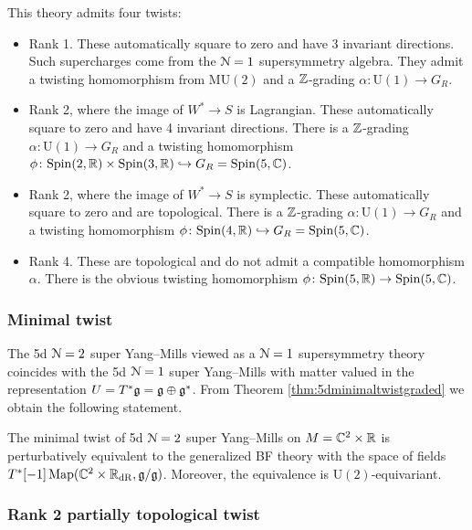 \documentclass[10pt, oneside]{article}
\newcommand{\MU}{\mathrm{MU}}
\renewcommand{\U}{\mathrm{U}}
\begin{document}
This theory admits four twists:
\begin{itemize}
\item Rank 1. These automatically square to zero and have 3 invariant directions. Such supercharges come from the $\mathcal N=1$ supersymmetry algebra. They admit a twisting homomorphism from $\MU(2)$ and a $\mathbb Z$-grading $\alpha\colon \U(1)\rightarrow G_R$.

\item Rank 2, where the image of $W^*\rightarrow S$ is Lagrangian. These automatically square to zero and have 4 invariant directions. There is a $\mathbb Z$-grading $\alpha\colon \U(1)\rightarrow G_R$ and a twisting homomorphism $\phi\colon \mathrm{Spin}(2, \mathbb R)\times \mathrm{Spin}(3, \mathbb R)\hookrightarrow G_R=\mathrm{Spin}(5, \mathbb C)$.

\item Rank 2, where the image of $W^*\rightarrow S$ is symplectic. These automatically square to zero and are topological. There is a $\mathbb Z$-grading $\alpha\colon \U(1)\rightarrow G_R$ and a twisting homomorphism $\phi\colon \mathrm{Spin}(4, \mathbb R)\hookrightarrow G_R=\mathrm{Spin}(5, \mathbb C)$.

\item Rank 4. These are topological and do not admit a compatible homomorphism $\alpha$. There is the obvious twisting homomorphism $\phi\colon \mathrm{Spin}(5, \mathbb R)\rightarrow \mathrm{Spin}(5, \mathbb C)$.
\end{itemize}

\subsubsection{Minimal twist}
\label{sect:5dminimaltwist}

The 5d $\mathcal N=2$ super Yang--Mills viewed as a $\mathcal N=1$ supersymmetry theory coincides with the 5d $\mathcal N=1$ super Yang--Mills with matter valued in the representation $U=T^*\mathfrak g=\mathfrak g\oplus \mathfrak g^*$. From Theorem \ref{thm:5dminimaltwistgraded} we obtain the following statement.

\begin{theorem}
The minimal twist of 5d $\mathcal N=2$ super Yang--Mills on $M=\mathbb C^2\times \mathbb R$ is perturbatively equivalent to the generalized BF theory with the space of fields $T^*[-1]\operatorname{Map}(\mathbb C^2\times \mathbb R_{\mathrm{dR}}, \mathfrak g/\mathfrak g)$. Moreover, the equivalence is $\U(2)$-equivariant.
\end{theorem}

\subsubsection{Rank 2 partially topological twist}
\label{sect:5dpartialtwist}
\end{document}
